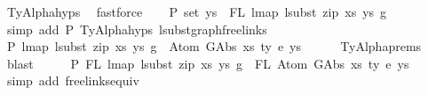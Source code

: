\begin{isabellebody}
\ TyAlpha{\isachardot}{\kern0pt}hyps{\isacharparenleft}{\kern0pt}{}{\isacharparenright}{\kern0pt}\ \isamarkupfalse%
\ fastforce\isanewline
\ \ \isamarkupfalse%
\ P{}{\isacharcolon}{\kern0pt}\ {\isachardoublequoteopen}set\ ys{\isacharprime}{\kern0pt}\ {\isacharequal}{\kern0pt}\ FL\ {\isacharparenleft}{\kern0pt}lmap\ {\isacharparenleft}{\kern0pt}lsubst\ {\isacharparenleft}{\kern0pt}zip\ xs{\isacharprime}{\kern0pt}\ ys{\isacharprime}{\kern0pt}{\isacharparenright}{\kern0pt}{\isacharparenright}{\kern0pt}\ g{\isacharparenright}{\kern0pt}{\isachardoublequoteclose}\isanewline
\ \ \ \ \isamarkupfalse%
\ {\isacharparenleft}{\kern0pt}simp\ add{\isacharcolon}{\kern0pt}\ P{}\ TyAlpha{\isachardot}{\kern0pt}hyps{\isacharparenleft}{\kern0pt}{}{\isacharcomma}{\kern0pt}{}{\isacharparenright}{\kern0pt}\ lsubst{\isacharunderscore}{\kern0pt}graph{\isacharunderscore}{\kern0pt}freelinks{\isacharparenright}{\kern0pt}\isanewline
\ \ \isamarkupfalse%
\ P{}{\isacharcolon}{\kern0pt}\ {\isachardoublequoteopen}lmap\ {\isacharparenleft}{\kern0pt}lsubst\ {\isacharparenleft}{\kern0pt}zip\ xs{\isacharprime}{\kern0pt}\ ys{\isacharprime}{\kern0pt}{\isacharparenright}{\kern0pt}{\isacharparenright}{\kern0pt}\ g\ {\isasymsimeq}\ Atom\ {\isacharparenleft}{\kern0pt}GAbs\ xs\ ty{}\ e{\isacharparenright}{\kern0pt}\ ys{\isachardoublequoteclose}\isanewline
\ \ \ \ \isamarkupfalse%
\ TyAlpha{\isachardot}{\kern0pt}prems{\isacharparenleft}{\kern0pt}{}{\isacharcomma}{\kern0pt}{}{\isacharparenright}{\kern0pt}\ \isamarkupfalse%
\ blast\isanewline
\ \ \isamarkupfalse%
\ \isamarkupfalse%
\ P{}{\isacharcolon}{\kern0pt}\ {\isachardoublequoteopen}FL\ {\isacharparenleft}{\kern0pt}lmap\ {\isacharparenleft}{\kern0pt}lsubst\ {\isacharparenleft}{\kern0pt}zip\ xs{\isacharprime}{\kern0pt}\ ys{\isacharprime}{\kern0pt}{\isacharparenright}{\kern0pt}{\isacharparenright}{\kern0pt}\ g{\isacharparenright}{\kern0pt}\ {\isacharequal}{\kern0pt}\ FL\ {\isacharparenleft}{\kern0pt}Atom\ {\isacharparenleft}{\kern0pt}GAbs\ xs\ ty{}\ e{\isacharparenright}{\kern0pt}\ ys{\isacharparenright}{\kern0pt}{\isachardoublequoteclose}\isanewline
\ \ \ \ \isamarkupfalse%
\ {\isacharparenleft}{\kern0pt}simp\ add{\isacharcolon}{\kern0pt}\ freelinks{\isacharunderscore}{\kern0pt}equiv{\isacharparenright}{\kern0pt}\isanewline
\ \ \isamarkupfalse%

\end{isabellebody}
